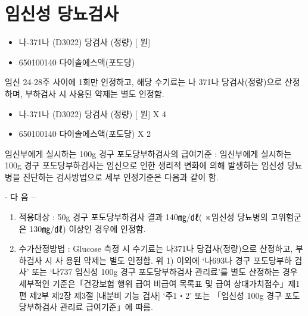 \section{임신성 당뇨검사} 
{
\begin{itemize}\tightlist
\item[\dschemical] 나-371나 (D3022) 당검사 (정량) [ 원]
\item[\dschemical] 650100140 다이솔에스액(포도당)
\end{itemize}
}
{
임신 24-28주 사이에 1회만 인정하고, 해당 수기료는 나 371나 당검사(정량)으로 산정하며, 부하검사 시 사용된 약제는 별도 인정함.
}
\prezi{\clearpage}

{
\begin{itemize}\tightlist
\item[\dschemical] 나-371나 (D3022) 당검사 (정량) [ 원] X 4
\item[\dschemical] 650100140 다이솔에스액(포도당) X 2
\end{itemize}
}
{
임신부에게 실시하는 100g 경구 포도당부하검사의 급여기준 : 임신부에게 실시하는 100g 경구 포도당부하검사는 임신으로 인한 생리적 변화에 의해 발생하는 임신성 당뇨병을 진단하는 검사방법으로 세부 인정기준은 다음과 같이 함. \par
      - 다 음 – 
\begin{enumerate}[가.]\tightlist
\item 적용대상 : 50g 경구 포도당부하검사 결과 140㎎/㎗( ※임신성 당뇨병의 고위험군 은 130㎎/㎗) 이상인 경우에 인정함. 
\item 수가산정방법 : Glucose 측정 시 수기료는 나371나 당검사(정량)으로 산정하고, 부하검사 시 사 용된 약제는 별도 인정함. 
위 1) 이외에 ‘나693나 경구 포도당부하 검사’ 또는 ‘나737 임신성 100g 경구 포도당부하검사 관리료’를 별도 산정하는 경우 세부적인 기준은「건강보험 행위 급여\cntrdot{} 비급여 목록표 및 급여 상대가치점수」제1편 제2부 제2장 제3절 [내분비 기능 검사] ‘주1‧2’ 또는 「임신성 100g 경구 포도당부하검사 관리료 급여기준」에 따름. 
\end{enumerate}
}

